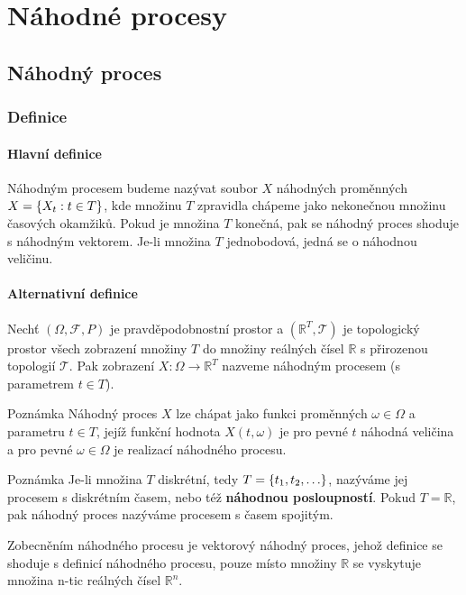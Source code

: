 \chapter{Náhodné procesy}
\section{Náhodný proces}
\subsection{Definice}
\subsubsection{Hlavní definice}
Náhodným procesem budeme nazývat soubor $X$ náhodných proměnných $X=\left\{X_t:t\in T\right\}$, kde množinu $T$ zpravidla chápeme jako nekonečnou množinu časových okamžiků. Pokud je množina $T$ konečná, pak se náhodný proces shoduje s náhodným vektorem. Je-li množina $T$ jednobodová, jedná se o náhodnou veličinu.

\subsubsection{Alternativní definice}
Nechť $(\Omega,\mathscr{F},P)$ je pravděpodobnostní prostor a $(\mathbb{R}^T,\mathscr{T})$ je topologický prostor všech zobrazení množiny $T$ do množiny reálných čísel $\mathbb{R}$ s přirozenou topologií $\mathscr{T}$. Pak zobrazení $X:\Omega\to\mathbb{R}^T$ nazveme náhodným procesem (s parametrem $t\in T$).

\begin{note}{Poznámka}
Náhodný proces $X$ lze chápat jako funkci proměnných $\omega\in\Omega$ a parametru $t\in T$, jejíž funkční hodnota $X(t,\omega)$ je pro pevné $t$ náhodná veličina a pro pevné $\omega\in\Omega$ je realizací náhodného procesu. 
\end{note}

\begin{note}{Poznámka}
Je-li množina $T$ diskrétní, tedy $T=\left\{t_1,t_2,\ldots\right\}$, nazýváme jej procesem s diskrétním časem, nebo též \textbf{náhodnou posloupností}. Pokud $T=\mathbb{R}$, pak náhodný proces nazýváme procesem s časem spojitým.
\end{note}

Zobecněním náhodného procesu je vektorový náhodný proces, jehož definice se shoduje s definicí náhodného procesu, pouze místo množiny $\mathbb{R}$ se vyskytuje množina n-tic reálných čísel $\mathbb{R}^n$.

